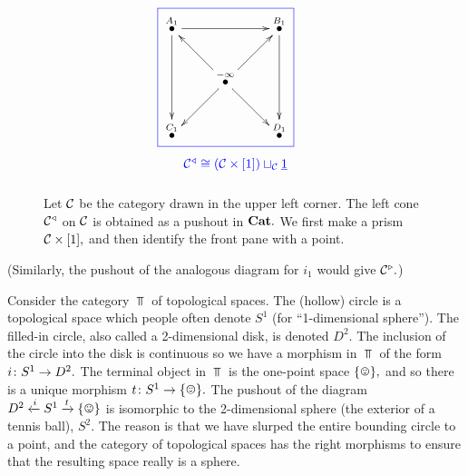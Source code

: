 \documentclass[../main/CT4S-EN-RU]{subfiles}
\begin{document}
\begin{exampleENG}
\begin{figure}[H]
$$\parbox{1.7in}{\cfbox{blue}{\parbox{1.7in}{
\xymatrix{
\LMO{A_1}\ar[rr]\ar[dd]&&\LMO{B_1}\ar[dd]\\
&\LMO{-\infty}\ar[ur]\ar[dr]\ar[ul]\ar[dl]\\
\LMO{C_1}&&\LMO{D_1}}}}\begin{center}\color{blue}{$\mcC\lcone\iso(\mcC\times[1])\sqcup_{\mcC}\ul{1}$}\end{center}}
$$
\caption{Let $\mathcal{C}$ be the category drawn in the upper left corner. The left cone $\mathcal{C}^\triangleleft$ on $\mathcal{C}$ is obtained as a pushout in ${\mathbf{Cat}}.$ We first make a prism $\mathcal{C}\times[1],$ and then identify the front pane with a point.}
\label{fig:left cone}
\end{figure}
(Similarly, the pushout of the analogous diagram for $i_1$ would give $\mathcal{C}^\triangleright.$)
\end{exampleENG}

\begin{exampleRUS}
\end{exampleRUS}

\begin{exampleENG}\label{ex:pushout in Top}
Consider the category $\Top$ of topological spaces. The (hollow) circle is a topological space which people often denote $S^1$ (for “1-dimensional sphere”). The filled-in circle, also called a 2-dimensional disk, is denoted $D^2.$ The inclusion of the circle into the disk is continuous so we have a morphism in $\Top$ of the form $i\colon S^1\rightarrow D^2.$ The terminal object in $\Top$ is the one-point space $\singleton,$ and so there is a unique morphism $t\taking S^1\to\singleton.$ The pushout of the diagram $D^2\From{i}S^1\To{t}\singleton$ is isomorphic to the 2-dimensional sphere (the exterior of a tennis ball), $S^2.$ The reason is that we have slurped the entire bounding circle to a point, and the category of topological spaces has the right morphisms to ensure that the resulting space really is a sphere. 
\end{exampleENG}

\begin{exampleRUS}\label{ex:pushout in Top}
\end{exampleRUS}
\end{document}
